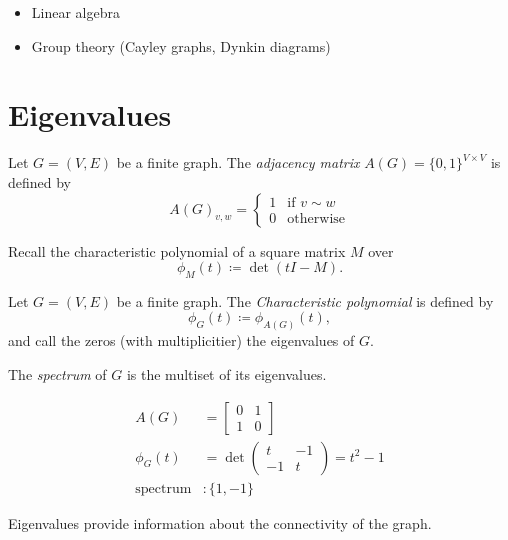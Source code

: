 \begin{itemize}
\item Linear algebra
\item Group theory (Cayley graphs, Dynkin diagrams)
\end{itemize}

\section{Eigenvalues}

\begin{definition}
Let \(G=(V,E)\) be a finite graph.
The \emph{adjacency matrix} \( A(G)=\{0,1\}^{V\times V} \) is defined by
\[ A(G)_{v,w}=\begin{cases} 1 & \text{if } v\sim w \\ 0 & \text{otherwise} \end{cases} \]
\end{definition}

Recall the characteristic polynomial of a square matrix \(M\) over \C
\[ \phi_M(t)\coloneqq \det(tI-M). \]


\begin{definition}
Let \(G=(V,E)\) be a finite graph.
The \emph{Characteristic polynomial} is defined by
\[ \phi_G(t)\coloneqq \phi_{A(G)}(t), \]
and call the zeros (with multiplicitier) the eigenvalues of \(G\).
\end{definition}

\begin{definition}[Spectrum]
The \emph{spectrum} of \(G\) is the multiset of its eigenvalues.
\end{definition}

\begin{example}[Spectrum]
\begin{align*}
A(G)&=\begin{bmatrix} 0 & 1 \\ 1 & 0 \end{bmatrix}\\
\phi_G(t)&=\det\begin{pmatrix} t & -1 \\ -1 & t \end{pmatrix}=t^2-1\\
\text{spectrum}&: \{1,-1\}
\end{align*}
\end{example}

\begin{remark}
Eigenvalues provide information about the connectivity of the graph.
\end{remark}



